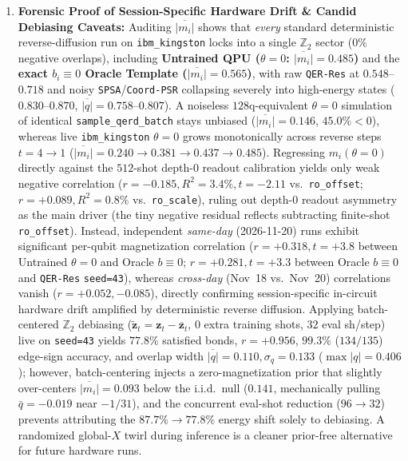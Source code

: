 \documentclass[11pt]{article}
\begin{document}
\begin{enumerate}[leftmargin=1.4em,itemsep=2pt,topsep=2pt]
  \item \textbf{Forensic Proof of Session-Specific Hardware Drift \& Candid Debiasing Caveats:} Auditing $\overline{|m_i|}$ shows that \emph{every} standard deterministic reverse-diffusion run on \texttt{ibm\_kingston} locks into a single $\mathbb{Z}_2$ sector ($0\%$ negative overlaps), including \textbf{Untrained QPU ($\theta{=}0$: $\overline{|m_i|}{=}0.485$)} and the \textbf{exact $b_i{\equiv}0$ Oracle Template ($\overline{|m_i|}{=}0.565$)}, with raw \texttt{QER-Res} at $0.548$--$0.718$ and noisy \texttt{SPSA}/\texttt{Coord-PSR} collapsing severely into high-energy states ($0.830$--$0.870$, $\overline{|q|}{=}0.758$--$0.807$). A noiseless $128$q-equivalent $\theta{=}0$ simulation of identical \texttt{sample\_qerd\_batch} stays unbiased ($\overline{|m_i|}{=}0.146$, $45.0\%{<}0$), whereas live \texttt{ibm\_kingston} $\theta{=}0$ grows monotonically across reverse steps $t{=}4{\to}1$ ($\overline{|m_i|}{=}0.240{\to}0.381{\to}0.437{\to}0.485$). Regressing $m_i(\theta{=}0)$ directly against the $512$-shot depth-$0$ readout calibration yields only weak negative correlation ($r{=}-0.185, R^2{=}3.4\%, t{=}-2.11$ vs.\ \texttt{ro\_offset}; $r{=}+0.089, R^2{=}0.8\%$ vs.\ \texttt{ro\_scale}), ruling out depth-$0$ readout asymmetry as the main driver (the tiny negative residual reflects subtracting finite-shot \texttt{ro\_offset}). Instead, independent \emph{same-day} (2026-11-20) runs exhibit significant per-qubit magnetization correlation ($r{=}+0.318, t{=}+3.8$ between Untrained $\theta{=}0$ and Oracle $b{\equiv}0$; $r{=}+0.281, t{=}+3.3$ between Oracle $b{\equiv}0$ and \texttt{QER-Res} \texttt{seed=43}), whereas \emph{cross-day} (Nov~18 vs.\ Nov~20) correlations vanish ($r{=}+0.052, -0.085$), directly confirming session-specific in-circuit hardware drift amplified by deterministic reverse diffusion. Applying batch-centered $\mathbb{Z}_2$ debiasing ($\tilde{\mathbf{z}}_t = \mathbf{z}_t - \overline{\mathbf{z}}_t$, $0$ extra training shots, $32$ eval sh/step) live on \texttt{seed=43} yields $77.8\%$ satisfied bonds, $r{=}+0.956$, $99.3\%$ ($134/135$) edge-sign accuracy, and overlap width $\overline{|q|}{=}0.110, \sigma_q{=}0.133$ ($\max|q|{=}0.406$); however, batch-centering injects a zero-magnetization prior that slightly over-centers $\overline{|m_i|}{=}0.093$ below the i.i.d.\ null ($0.141$, mechanically pulling $\bar{q}{=}-0.019$ near $-1/31$), and the concurrent eval-shot reduction ($96{\to}32$) prevents attributing the $87.7\%{\to}77.8\%$ energy shift solely to debiasing. A randomized global-$X$ twirl during inference is a cleaner prior-free alternative for future hardware runs.
\end{enumerate}
\end{document}
